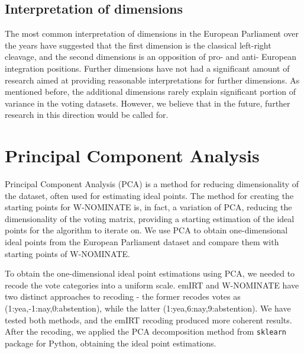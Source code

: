 \documentclass[a4paper,12pt]{report}
\begin{document}
            \subsection{Interpretation of dimensions}\label{subsec:interpretation-of-dimensions}
                The most common interpretation of dimensions in the European Parliament over the years have suggested
                that the first
                dimension
                is the classical left-right cleavage, and the second dimensions is an opposition of pro- and anti-
                European
                integration positions.
                Further dimensions have not had a significant amount of research aimed at providing reasonable
                interpretations for
                further dimensions.
                As mentioned before, the additional dimensions rarely explain significant portion of variance in the
                voting
                datasets.
                However, we believe that in the future, further research in this direction would be called for.


        \section{Principal Component Analysis}\label{sec:principal-component-analysis}
            Principal Component Analysis (PCA) is a method for reducing dimensionality of the dataset, often used for
            estimating ideal points. The method for creating the starting points for W-NOMINATE is, in fact, a variation
            of
            PCA, reducing the dimensionality of the voting matrix, providing a starting estimation of the ideal points
            for
            the algorithm to iterate on. We use PCA to obtain one-dimensional ideal points from the European Parliament
            dataset and compare them with starting points of W-NOMINATE.
            \label{subsec:pca}

            To obtain the one-dimensional ideal point estimations using PCA, we needed to recode the vote categories
            into a
            uniform scale.
            emIRT and W-NOMINATE have two distinct approaches to recoding - the former recodes votes as
            (1:yea,-1:nay,0:abstention), while the latter (1:yea,6:nay,9:abstention). We have tested both methods, and
            the
            emIRT recoding produced more coherent results. After the recoding, we applied the PCA decomposition method
            from
            \texttt{sklearn} package for Python, obtaining the ideal point estimations.
\end{document}
